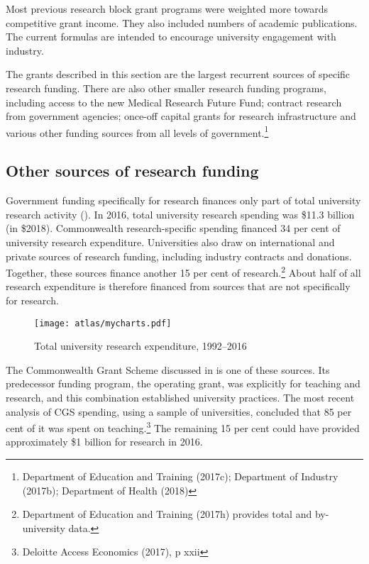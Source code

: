 \documentclass{grattan}
\begin{document}
Most previous research block grant programs were weighted more towards competitive grant income. They also included numbers of academic publications. The current formulas are intended to encourage university engagement with industry.

The grants described in this section are the largest recurrent sources of specific research funding. There are also other smaller research funding programs, including access to the new Medical Research Future Fund; contract research from government agencies; once-off capital grants for research infrastructure and various other funding sources from all levels of government.\footnote{Department of Education and Training (2017c); Department of Industry (2017b); Department of Health (2018)}

%
\subsection{Other sources of research funding}\label{subsec:other-sources-of-research-funding}

Government funding specifically for research finances only part of total university research activity (). In 2016, total university research spending was \$11.3 billion (in \$2018). Commonwealth research-specific spending financed 34 per cent of university research expenditure. Universities also draw on international and private sources of research funding, including industry contracts and donations. Together, these sources finance another 15 per cent of research.\footnote{Department of Education and Training (2017h) provides total and by-university data.} About half of all research expenditure is therefore financed from sources that are not specifically for research.

    \begin{figure} %
    \caption{Total university research expenditure, 1992--2016}\label{fig:total-university-research-expenditure-19922016}
    \texttt{[image: atlas/mycharts.pdf]}
    \end{figure}


The Commonwealth Grant Scheme discussed in  is one of these sources. Its predecessor funding program, the operating grant, was explicitly for teaching and research, and this combination established university practices. The most recent analysis of CGS spending, using a sample of universities, concluded that 85 per cent of it was spent on teaching.\footnote{Deloitte Access Economics (2017), p xxii} The remaining 15 per cent could have provided approximately \$1 billion for research in 2016.
\end{document}
